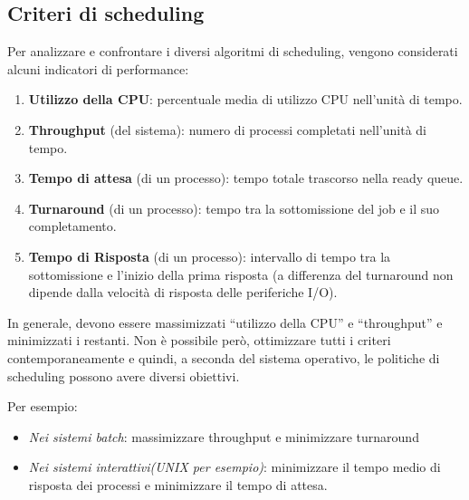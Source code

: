 \documentclass{article}
\begin{document}
\subsection{Criteri di scheduling}
\noindent Per analizzare e confrontare i diversi algoritmi 
di scheduling, vengono considerati alcuni indicatori di
performance:
\begin{enumerate}
    \item \textbf{Utilizzo della CPU}: percentuale media di
    utilizzo CPU nell'unità di tempo.
    \item \textbf{Throughput} (del sistema): numero di
    processi completati nell'unità di tempo.
    \item \textbf{Tempo di attesa} (di un processo): tempo
    totale trascorso nella ready queue.
    \item \textbf{Turnaround} (di un processo): tempo tra
    la sottomissione del job e il suo completamento.
    \item \textbf{Tempo di Risposta} (di un processo): 
    intervallo di tempo tra la sottomissione e l'inizio
    della prima risposta (a differenza del turnaround non
     dipende dalla velocità di risposta delle periferiche 
     I/O).
\end{enumerate}

\noindent In generale, devono essere massimizzati
“utilizzo della CPU” e “throughput” e minimizzati i restanti.
Non è possibile però, ottimizzare tutti i criteri
contemporaneamente e quindi, a seconda del sistema operativo,
le politiche di scheduling possono avere diversi obiettivi.

Per esempio: \begin{itemize}
    \item \textit{Nei sistemi batch}: massimizzare throughput e
     minimizzare turnaround
    \item \textit{Nei sistemi interattivi(UNIX per esempio)}: 
    minimizzare il tempo medio di risposta dei processi e
    minimizzare il tempo di attesa.
\end{itemize}
\end{document}
